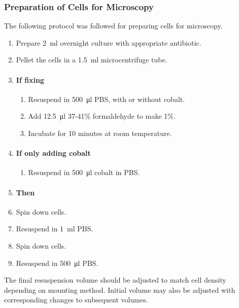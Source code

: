 \documentclass[../main.tex]{subfiles}
\begin{document}
\subsubsection{Preparation of Cells for Microscopy}

The following protocol was followed for preparing cells for microscopy.

\begin{enumerate}
\item Prepare \SI{2}{\milli\litre} overnight culture with appropriate antibiotic.
\item Pellet the cells in a \SI{1.5}{\milli\litre} microcentrifuge tube.
\item \paragraph{If fixing}
\begin{enumerate}
\item Resuspend in \SI{500}{\micro\litre} PBS, with or without cobalt.
\item Add \SI{12.5}{\micro\litre} 37-41\% formaldehyde to make 1\%.
\item Incubate for 10 minutes at room temperature.
\end{enumerate}
\item \paragraph{If only adding cobalt}
\begin{enumerate}
\item Resuspend in \SI{500}{\micro\litre} cobalt in PBS.
\end{enumerate}
\item[] \paragraph{Then}
\item Spin down cells.
\item Resuspend in \SI{1}{\milli\litre} PBS.
\item Spin down cells.
\item Resuspend in \SI{500}{\micro\litre} PBS.
\end{enumerate}

The final resuspension volume should be adjusted to match cell density depending on mounting method. Initial volume may also be adjusted with corresponding changes to subsequent volumes.
\end{document}

